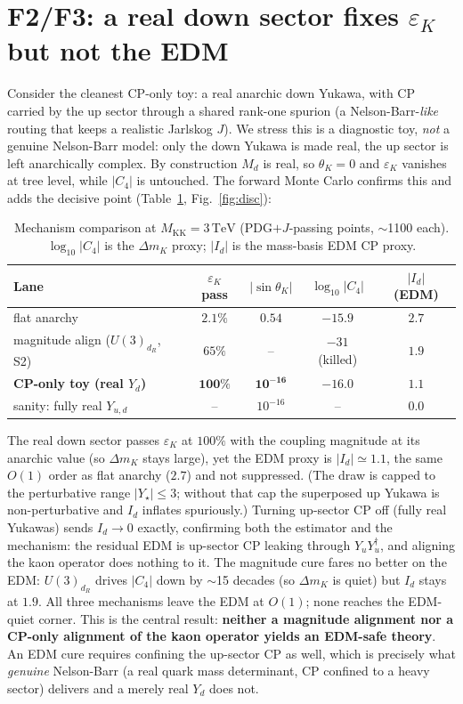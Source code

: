 \documentclass[11pt]{article}
\newcommand{\MKK}{M_{\mathrm{KK}}}
\newcommand{\epsK}{\varepsilon_K}
\newcommand{\dmK}{\Delta m_K}
\newcommand{\TeV}{\,\mathrm{TeV}}
\begin{document}
\section{F2/F3: a real down sector fixes $\epsK$ but not the EDM}
Consider the cleanest CP-only toy: a real anarchic down Yukawa, with CP carried by the
up sector through a shared rank-one spurion (a Nelson-Barr-\emph{like} routing that
keeps a realistic Jarlskog $J$). We stress this is a diagnostic toy, \emph{not} a
genuine Nelson-Barr model: only the down Yukawa is made real, the up sector is left
anarchically complex. By construction $M_d$ is real, so $\theta_K=0$ and $\epsK$
vanishes at tree level, while $|C_4|$ is untouched. The forward Monte Carlo confirms
this and adds the decisive point (Table~\ref{tab:disc}, Fig.~\ref{fig:disc}):
\begin{table}[h]
  \centering
  \caption{Mechanism comparison at $\MKK=3\TeV$ (PDG$+J$-passing points, $\sim$1100
  each). $\log_{10}|C_4|$ is the $\dmK$ proxy; $|I_d|$ is the mass-basis EDM CP proxy.}
  \label{tab:disc}
  \begin{tabular}{lcccc}
    \toprule
    Lane & $\epsK$ pass & $|\sin\theta_K|$ & $\log_{10}|C_4|$ & $|I_d|$ (EDM) \\
    \midrule
    flat anarchy                    & $2.1\%$ & $0.54$    & $-15.9$ & $2.7$ \\
    magnitude align ($U(3)_{d_R}$, S2) & $65\%$ & --      & $-31$ (killed) & $1.9$ \\
    \textbf{CP-only toy (real $Y_d$)} & $\mathbf{100\%}$ & $\mathbf{10^{-16}}$ & $\mathbf{-16.0}$ & $\mathbf{1.1}$ \\
    \midrule
    sanity: fully real $Y_{u,d}$    & --      & $10^{-16}$ & --     & $0.0$ \\
    \bottomrule
  \end{tabular}
\end{table}

The real down sector passes $\epsK$ at $100\%$ with the coupling magnitude at its
anarchic value (so $\dmK$ stays large), yet the EDM proxy is $|I_d|\simeq1.1$, the
same $O(1)$ order as flat anarchy ($2.7$) and not suppressed. (The draw is capped to
the perturbative range $|Y_\star|\le3$; without that cap the superposed up Yukawa is
non-perturbative and $I_d$ inflates spuriously.) Turning up-sector CP off (fully real
Yukawas) sends $I_d\to0$ exactly, confirming both the estimator and the mechanism: the
residual EDM is up-sector CP leaking through $Y_uY_u^\dagger$, and aligning the kaon
operator does nothing to it. The magnitude cure fares no better on the EDM: $U(3)_{d_R}$
drives $|C_4|$ down by $\sim$15 decades (so $\dmK$ is quiet) but $I_d$ stays at $1.9$.
All three mechanisms leave the EDM at $O(1)$; none reaches the EDM-quiet corner. This is
the central result: \textbf{neither a magnitude alignment nor a CP-only alignment of
the kaon operator yields an EDM-safe theory}. An EDM cure requires confining the
up-sector CP as well, which is precisely what \emph{genuine} Nelson-Barr (a real quark
mass determinant, CP confined to a heavy sector) delivers and a merely real $Y_d$ does
not.
\end{document}
